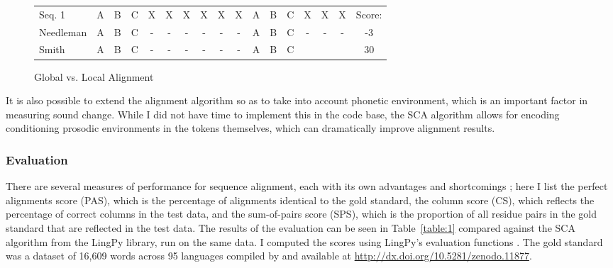 \documentclass[doc,natbib,11pt]{apa6}
\begin{document}
\begin{figure}[b]
	
	\begin{tabular}{|l||ccccccccccccccc||c|}
		\hline
		Seq. 1 & A&B&C&X&X&X&X&X&X&A&B&C&X&X&X&Score:\\
		Needleman & A&B&C&-&-&-&-&-&-&A&B&C&-&-&-&-3\\
		Smith & A&B&C&-&-&-&-&-&-&A&B&C&&&&30\\\hline
	\end{tabular}
	\caption{Global vs. Local Alignment}
	\label{figure:1}
\end{figure}



It is also possible to extend the alignment algorithm so as to take into account phonetic environment, which is an important factor in measuring sound change. While I did not have time to implement this in the code base, the SCA algorithm allows for encoding conditioning prosodic environments in the tokens themselves, which can dramatically improve alignment results.

\subsubsection{Evaluation}

There are several measures of performance for sequence alignment, each with its own advantages and shortcomings \citep{List2012b}; here I list the perfect alignments score (PAS), which is the percentage of alignments identical to the gold standard, the column score (CS), which reflects the percentage of correct columns in the test data, and the sum-of-pairs score (SPS), which is the proportion of all residue pairs in the gold standard that are reflected in the test data. The results of the evaluation can be seen in Table~\ref{table:1} compared against the SCA algorithm from the LingPy library, run on the same data. I computed the scores using LingPy's evaluation functions \citep{List2016}. The gold standard was a dataset of 16,609 words across 95 languages compiled by \citet{List2014} and available at \url{http://dx.doi.org/10.5281/zenodo.11877}.
\begin{table}[h]
\end{table}
\end{document}
